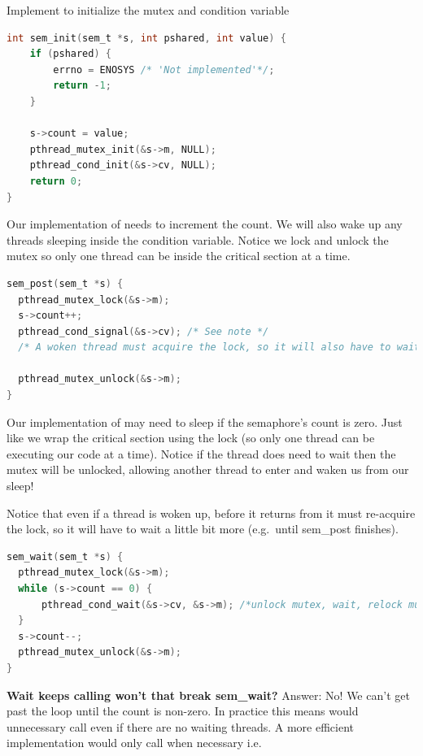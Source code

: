 Implement  to initialize the mutex and condition variable

\begin{lstlisting}[language=C]
int sem_init(sem_t *s, int pshared, int value) {
    if (pshared) { 
        errno = ENOSYS /* 'Not implemented'*/; 
        return -1;
    }

    s->count = value;
    pthread_mutex_init(&s->m, NULL);
    pthread_cond_init(&s->cv, NULL);
    return 0;
}
\end{lstlisting}

Our implementation of  needs to increment the count. We will also wake up any threads sleeping inside the condition variable. Notice we lock and unlock the mutex so only one thread can be inside the critical section at a time.

\begin{lstlisting}[language=C]
sem_post(sem_t *s) {
  pthread_mutex_lock(&s->m);
  s->count++;
  pthread_cond_signal(&s->cv); /* See note */
  /* A woken thread must acquire the lock, so it will also have to wait until we call unlock*/

  pthread_mutex_unlock(&s->m);
}
\end{lstlisting}

Our implementation of  may need to sleep if the semaphore's count is zero. Just like  we wrap the critical section using the lock (so only one thread can be executing our code at a time). Notice if the thread does need to wait then the mutex will be unlocked, allowing another thread to enter  and waken us from our sleep!

Notice that even if a thread is woken up, before it returns from  it must re-acquire the lock, so it will have to wait a little bit more (e.g.~until sem\_post finishes).

\begin{lstlisting}[language=C]
sem_wait(sem_t *s) {
  pthread_mutex_lock(&s->m);
  while (s->count == 0) {
      pthread_cond_wait(&s->cv, &s->m); /*unlock mutex, wait, relock mutex*/
  }
  s->count--;
  pthread_mutex_unlock(&s->m);
}
\end{lstlisting}

\textbf{Wait  keeps calling  won't that break sem\_wait?} Answer: No! We can't get past the loop until the count is non-zero. In practice this means  would unnecessary call  even if there are no waiting threads. A more efficient implementation would only call  when necessary i.e.

